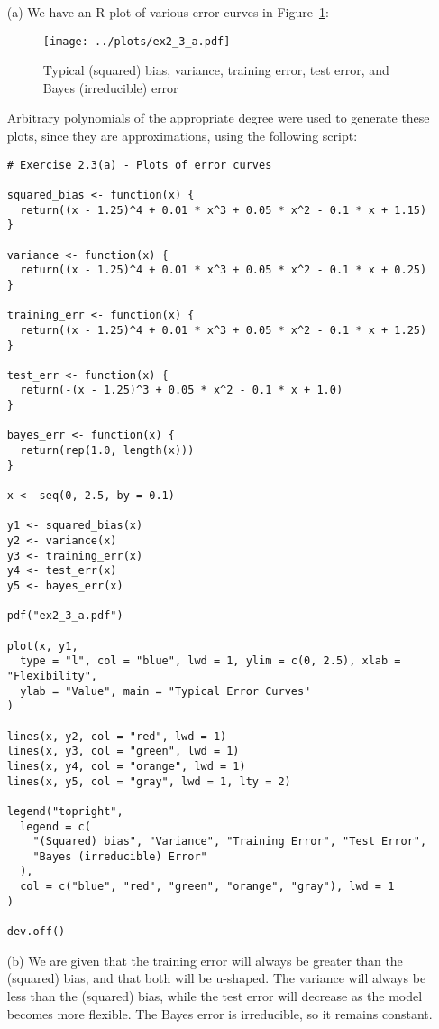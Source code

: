
\begin{itemize}
    \item[(a)] We have an R plot of various error curves in Figure~\ref{fig1}:
    \begin{figure}[!ht]
        \texttt{[image: ../plots/ex2\_3\_a.pdf]}
        \caption{
            Typical (squared) bias, variance, training error, test error, and Bayes 
            (irreducible) error \label{fig1}
        }
    \end{figure}
    Arbitrary polynomials of the appropriate degree were used to generate these 
    plots, since they are approximations, using the following script:
    \scriptsize\begin{verbatim}
# Exercise 2.3(a) - Plots of error curves

squared_bias <- function(x) {
  return((x - 1.25)^4 + 0.01 * x^3 + 0.05 * x^2 - 0.1 * x + 1.15)
}

variance <- function(x) {
  return((x - 1.25)^4 + 0.01 * x^3 + 0.05 * x^2 - 0.1 * x + 0.25)
}

training_err <- function(x) {
  return((x - 1.25)^4 + 0.01 * x^3 + 0.05 * x^2 - 0.1 * x + 1.25)
}

test_err <- function(x) {
  return(-(x - 1.25)^3 + 0.05 * x^2 - 0.1 * x + 1.0)
}

bayes_err <- function(x) {
  return(rep(1.0, length(x)))
}

x <- seq(0, 2.5, by = 0.1)

y1 <- squared_bias(x)
y2 <- variance(x)
y3 <- training_err(x)
y4 <- test_err(x)
y5 <- bayes_err(x)

pdf("ex2_3_a.pdf")

plot(x, y1,
  type = "l", col = "blue", lwd = 1, ylim = c(0, 2.5), xlab = "Flexibility",
  ylab = "Value", main = "Typical Error Curves"
)

lines(x, y2, col = "red", lwd = 1)
lines(x, y3, col = "green", lwd = 1)
lines(x, y4, col = "orange", lwd = 1)
lines(x, y5, col = "gray", lwd = 1, lty = 2)

legend("topright",
  legend = c(
    "(Squared) bias", "Variance", "Training Error", "Test Error",
    "Bayes (irreducible) Error"
  ),
  col = c("blue", "red", "green", "orange", "gray"), lwd = 1
)

dev.off()

    \end{verbatim}\normalsize
  \item[(b)] We are given that the training error will always be greater than
  the (squared) bias, and that both will be u-shaped. The variance will always
  be less than the (squared) bias, while the test error will decrease as the model
  becomes more flexible. The Bayes error is irreducible, so it remains constant.
\end{itemize}
